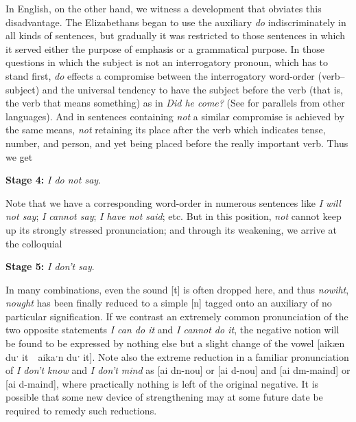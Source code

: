 In English, on the other hand, we witness a development that obviates this disadvantage. The Elizabethans began to use the auxiliary \textit{do} indiscriminately in all kinds of sentences, but gradually it was restricted to those sentences in which it served either the purpose of emphasis or a grammatical purpose. In those questions in which the subject is not an interrogatory pronoun, which has to stand first, \textit{do} effects a compromise between the interrogatory word-order (verb--subject) %
and the universal tendency to have the subject before the verb (that is, the verb that means something) as in \textit{Did he come?} (See \citet[\href{https://archive.org/details/progressinlangua00jespuoft/page/92/mode/2up?view=theater}{93}]{jespersen1894progress} for parallels from other languages). And in sentences containing \textit{not} a similar compromise is achieved by the same means, \textit{not} retaining its place after the verb which indicates tense, number, and person, and yet being placed before the really important verb. Thus we get

\bigskip

\textbf{Stage 4:} \textit{I do not say}.

\bigskip

Note that we have a corresponding word-order in numerous sentences like \textit{I will not say}; \textit{I cannot say}; \textit{I have not said}; etc. But in this position, \textit{not} cannot keep up its strongly stressed pronunciation; and through its weakening, we arrive at the colloquial

\bigskip

\textbf{Stage 5:} \textit{I don't say}.

\bigskip

In many combinations, even the sound [t] is often dropped here, and thus \textit{nowiht}, \textit{nought} has been finally reduced to a simple [n] tagged onto an auxiliary of no particular signification. If we contrast an extremely common pronunciation of the two opposite statements \textit{I can do it} and \textit{I cannot do it}, the negative notion will be found to be expressed by nothing else but a slight change of the vowel [aikæn duˑ it~\vert~aikaˑn duˑ it]. Note also the extreme reduction in a familiar pronunciation of \textit{I don't know} and \textit{I don't mind} as [ai dn-nou] or [ai d-nou] and [ai dm-maind] or [ai d-maind], where practically nothing is left of the original negative. It is possible that some new device of strengthening may at some future date be required to remedy such reductions.

